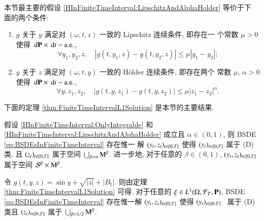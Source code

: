 \begin{remark}
  本节最主要的假设 \ref{HInFiniteTimeInterval:LipschitzAndAlphaHolder} 等价于下
  面的两个条件:
  \begin{enumerate}
    \renewcommand{\theenumi}{(H\arabic{enumi})}
    \renewcommand{\labelenumi}{\theenumi}

    \item $g$ 关于 $y$ 满足对 $(\omega,t,z)$ 一致的 Lipschitz 连续条件, 即存在一
          个常数 $\mu>0$ 使得 $\,\mathrm{d}\mathrm{\mathbf{P}}\times\,\mathrm{d} t-\mathrm{a.e.}$,
          $$\forall y_1,y_2,z, \quad |g(t,y_1,z)-g(t,y_2,z)|\leq\mu|y_1-y_2|;$$
    \item $g$ 关于 $z$ 满足对 $(\omega,t,y)$ 一致的 H\"older 连续条件, 即存在两个
          常数 $\mu$, $\alpha>0$ 使得 $\,\mathrm{d}\mathrm{\mathbf{P}}\times\,\mathrm{d} t-\mathrm{a.e.}$,
          $$\forall y,z_1,z_2,\quad |g(t,y,z_1)-g(t,y,z_2)|\leq\mu|z_1-z_2|^\alpha.$$
  \end{enumerate}
\end{remark}


下面的定理 \ref{thm:FiniteTimeIntervalL1Solution} 是本节的主要结果.

\begin{theorem}\label{thm:FiniteTimeIntervalL1Solution}
  假设 \ref{HInFiniteTimeInterval:OnlyIntegrable} 和 \ref{HInFiniteTimeInterval:LipschitzAndAlphaHolder}
  成立且 $\alpha\in(0,1)$, 则 BSDE \eqref{eq:BSDEsInFiniteTimeInterval} 存在惟一
  解 $(y_t,z_t)_{t\in[0,T]}$ 使得 $(y_t)_{t\in[0,T]}$ 属于 (D) 类, 且
  $(z_t)_{t\in[0,T]}$ 属于空间 $\bigcup_{\beta>\alpha}{\rm M}^\beta$. 进一步地, 对于任意的
  $\beta\in(0,1)$,
  $(y_t,z_t)_{t\in[0,T]}$ 属于空间 $\mathcal{S}^\beta\times{\rm M}^\beta$.
\end{theorem}

\begin{example}
  令 $g(t,y,z)=\sin y+\sqrt{|z|}+|B_t|$. 则由定理 \ref{thm:FiniteTimeIntervalL1Solution}
  可得, 对于任意的 $\xi\in L^1(\Omega,\mathcal{F}_T,\mathrm{\mathbf{P}})$, BSDE \eqref{eq:BSDEsInFiniteTimeInterval}
  存在惟一解 $(y_t,z_t)_{t\in[0,T]}$ 使得 $(y_t)_{t\in[0,T]}$~
  属于 (D) 类且
   $(z_t)_{t\in[0,T]}$ 属于 $\bigcup_{\beta>1/2}{\rm M}^\beta$.
\end{example}

